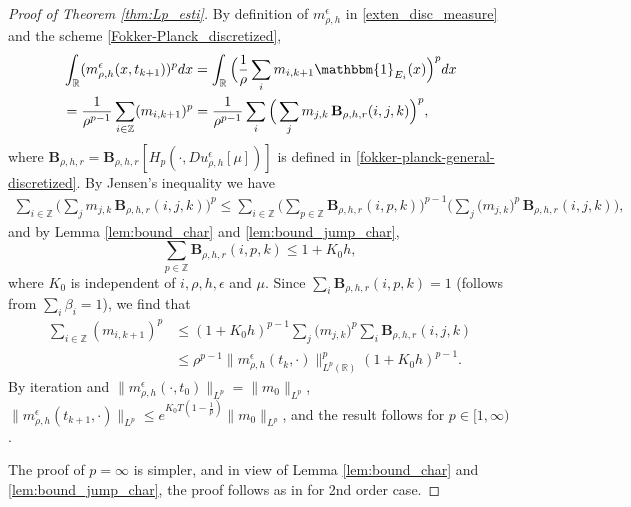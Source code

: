 \documentclass[a4paper,  twoside, 10pt, leqno]{amsart}
\newcommand{\Z}{\mathbb{Z}}
\newcommand{\R}{\mathbb{R}}
\theoremstyle{remark}
\theoremstyle{definition}
\begin{document}
\begin{proof}[Proof of Theorem \ref{thm:Lp_esti}]
By definition of $m^{\epsilon}_{\rho, h}$ in \eqref{exten_disc_measure} and the scheme \eqref{Fokker-Planck_discretized},
\begin{align*}
&\int_{\R} ( m^{\epsilon}_{\rho, h}(x, t_{k+1}))^p dx 
  =  \int_{\R} \Big( \frac{1}{\rho} \sum_{i} m_{i,k+1} \mathbbm{1}_{E_i}(x)\Big)^p dx 
\\
& =  \frac{1}{\rho^{p-1}} \sum_{i\in \Z} (m_{i,k+1})^p  = \frac{1}{\rho^{p-1}} \sum_{i} \Big( \sum_{j} m_{j,k} \, \mathbf{B}_{\rho,h,r} ( i,j,k )\Big)^p, 
\end{align*} 
where $\mathbf{B}_{\rho,h,r} =\mathbf{B}_{\rho,h,r} [ H_{p} ( \cdot, Du_{\rho,h}^{\epsilon}[\mu] ) ]$ is defined in \eqref{fokker-planck-general-discretized}. 
By  Jensen's inequality we have 
\begin{align*}
\sum_{i\in \Z} \Big( \sum_{j} m_{j,k}\, \mathbf{B}_{\rho,h,r} ( i,j,k )\Big)^p
\leq \sum_{i\in \Z} \Big(\sum_{p\in \Z}\mathbf{B}_{\rho,h,r} ( i,p,k )\Big)^{p-1} \Big(\sum_{j} \big(m_{j,k}\big)^p \, \mathbf{B}_{\rho,h,r} ( i,j,k ) \Big),
\end{align*}
and by Lemma \ref{lem:bound_char} and  \ref{lem:bound_jump_char},
$$\sum_{p\in \Z}\mathbf{B}_{\rho,h,r} ( i,p,k ) \leq 1+ K_0h,$$
where $K_0$ is independent of  $i, \rho, h, \epsilon$ and $\mu$. Since $\sum_{i} \mathbf{B}_{\rho,h,r} ( i,p,k ) =1$ (follows from $\sum_{i} \beta_i =1$), we find that
\begin{align*}
\sum_{i\in \Z} (m_{i,k+1})^p  
 &\leq (1+K_0h)^{p-1} \sum_{j}\big(m_{j,k}\big)^p \sum_{i} \mathbf{B}_{\rho,h,r} ( i,j,k ) \\
 &\leq \rho^{p-1} \|m^{\epsilon}_{\rho,h}(t_k,\cdot)\|^p_{L^p(\R)} (1+ K_0h)^{p-1}.
 \end{align*} 
By iteration and $\|m^{\epsilon}_{\rho, h}(\cdot, t_0)\|_{L^{p}} = \|m_0\|_{L^{p}}$, $\|m^{\epsilon}_{\rho,h}(t_{k+1},\cdot)\|_{L^p} \leq e^{K_0T(1-\frac 1p)} \|m_0\|_{L^p}$, and the result follows for $p\in[1,\infty)$.

The proof of $p=\infty$ is simpler, and in view of Lemma \ref{lem:bound_char} and \ref{lem:bound_jump_char}, the proof follows as in  \cite{carlini2015semi} for 2nd order case. 
\end{proof}
\end{document}
